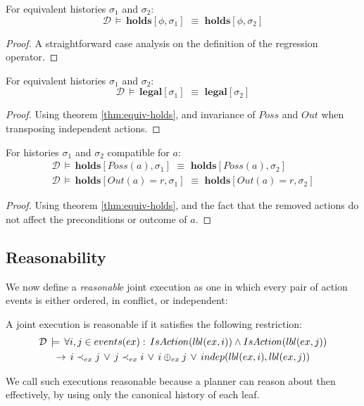 \begin{thm}
\label{thm:equiv-holds}For equivalent histories $\sigma_{1}$ and
$\sigma_{2}$:\[
\mathcal{D}\,\models\,\mathbf{holds}[\phi,\sigma_{1}]\,\,\equiv\,\,\mathbf{holds}[\phi,\sigma_{2}]\]

\end{thm}
\begin{proof}
A straightforward case analysis on the definition of the regression
operator. 
\end{proof}
\begin{thm}
\label{thm:equiv-legal}For equivalent histories $\sigma_{1}$ and
$\sigma_{2}$:\[
\mathcal{D}\,\models\,\mathbf{legal}[\sigma_{1}]\,\,\equiv\,\,\mathbf{legal}[\sigma_{2}]\]

\end{thm}
\begin{proof}
Using theorem \ref{thm:equiv-holds}, and invariance of $Poss$ and
$Out$ when transposing independent actions. 
\end{proof}
\begin{thm}
\label{thm:equiv-compat}For histories $\sigma_{1}$ and $\sigma_{2}$
compatible for $a$:\begin{gather*}
\mathcal{D}\,\models\,\mathbf{holds}[Poss(a),\sigma_{1}]\,\,\equiv\,\,\mathbf{holds}[Poss(a),\sigma_{2}]\\
\mathcal{D}\,\models\,\mathbf{holds}[Out(a)=r,\sigma_{1}]\,\,\equiv\,\,\mathbf{holds}[Out(a)=r,\sigma_{2}]\end{gather*}

\end{thm}
\begin{proof}
Using theorem \ref{thm:equiv-holds}, and the fact that the removed
actions do not affect the preconditions or outcome of $a$. 
\end{proof}

\subsection{Reasonability}

We now define a \emph{reasonabl}e joint execution as one in which
every pair of action events is either ordered, in conflict, or independent:

\begin{defnL}
 A joint execution is reasonable
if it satisfies the following restriction:\begin{multline*}
\mathcal{D}\,\models\,\forall i,j\in events(ex):\, IsAction(lbl(ex,i))\wedge IsAction(lbl(ex,j))\\
\rightarrow\, i\prec_{ex}j\,\vee\, j\prec_{ex}i\,\vee\, i\oplus_{ex}j\,\vee\, indep(lbl(ex,i),lbl(ex,j))\end{multline*}

\end{defnL}
We call such executions reasonable because a planner can reason about
then effectively, by using only the canonical history of each leaf.


